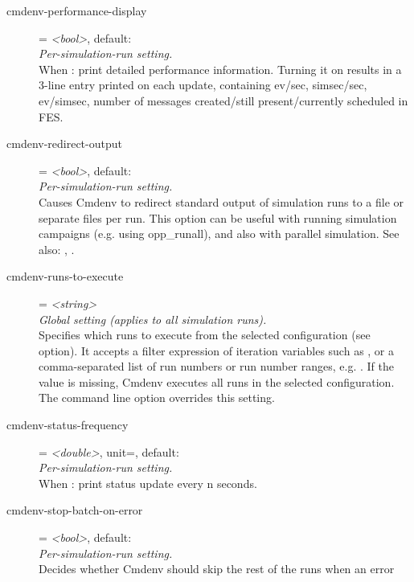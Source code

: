 \begin{description}
\item[cmdenv-performance-display] = \textit{<bool>}, default: \\
    \textit{Per-simulation-run setting.}\\
    When :
    print detailed performance information. Turning it on results in a 3-line
    entry printed on each update, containing ev/sec, simsec/sec, ev/simsec,
    number of messages created/still present/currently scheduled in FES.
\item[cmdenv-redirect-output] = \textit{<bool>}, default: \\
    \textit{Per-simulation-run setting.}\\
    Causes Cmdenv to redirect standard output of simulation runs to a file or
    separate files per run. This option can be useful with running simulation
    campaigns (e.g. using opp\_runall), and also with parallel simulation. See
    also: ,
    .
\item[cmdenv-runs-to-execute] = \textit{<string>}\\
    \textit{Global setting (applies to all simulation runs).}\\
    Specifies which runs to execute from the selected configuration (see
     option). It accepts a
    filter expression of iteration variables such as , or
    a comma-separated list of run numbers or run number ranges, e.g.
    . If
    the value is missing, Cmdenv executes all runs in the selected
    configuration. The  command line option overrides this
    setting.
\item[cmdenv-status-frequency] = \textit{<double>}, unit=, default: \\
    \textit{Per-simulation-run setting.}\\
    When :
    print status update every n seconds.
\item[cmdenv-stop-batch-on-error] = \textit{<bool>}, default: \\
    \textit{Per-simulation-run setting.}\\
    Decides whether Cmdenv should skip the rest of the runs when an error

\end{description}
